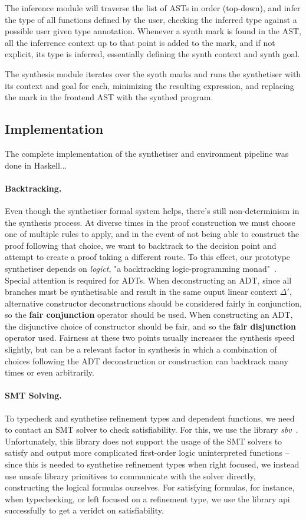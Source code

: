 \documentclass{llncs}
\newcommand{\mypara}[1]{\paragraph{\textbf{#1}.}}
\begin{document}
The inference module will traverse the list of ASTs in order (top-down), and
infer the type of all functions defined by the user, checking the inferred
type against a possible user given type annotation. Whenever a synth mark is
found in the AST, all the inferrence context up to that point is added to the
mark, and if not explicit, its type is inferred, essentially defining the synth
context and synth goal.

The synthesis module iterates over the synth marks and runs the synthetiser with
its context and goal for each, minimizing the resulting expression, and
replacing the mark in the frontend AST with the synthed program.


\subsection{Implementation}

The complete implementation of the synthetiser and environment
pipeline was done in Haskell...

\mypara{Backtracking} Even though the synthetiser formal system helps, there's
still non-determinism in the synthesis process. At diverse times in the proof
construction we must choose one of multiple rules to apply, and in the event of
not being able to construct the proof following that choice, we want to
backtrack to the decision point and attempt to create a proof taking a different
route. To this effect, our prototype synthetiser depends on \emph{logict}, "a
backtracking logic-programming monad"~\cite{logict}. Special attention is
required for ADTs. When deconstructing an ADT, since all branches must be
synthetisable and result in the same ouput linear context $\Delta'$, alternative
constructor deconstructions should be considered fairly in conjunction, so the
\textbf{fair conjunction} operator should be used. When constructing an ADT, the
disjunctive choice of constructor should be fair, and so the \textbf{fair
disjunction} operator used. Fairness at these two points usually increases
the synthesis speed slightly, but can be a relevant factor in synthesis in which a
combination of choices following the ADT deconstruction or construction can
backtrack many times or even arbitrarily.

\mypara{SMT Solving} To typecheck and synthetise refinement types and dependent
functions, we need to contact an SMT solver to check satisfiability. For this,
we use the library \emph{sbv}~\cite{sbv}. Unfortunately, this library does not
support the usage of the SMT solvers to satisfy and output more complicated
first-order logic uninterpreted functions -- since this is needed to synthetise refinement types
when right focused, we instead use unsafe library primitives to communicate with
the solver directly, constructing the logical formulas ourselves. For 
satisfying formulas, for instance, when typechecking, or left focused on a
refinement type, we use the library api successfully to get a veridct on
satisfiability.
\end{document}
